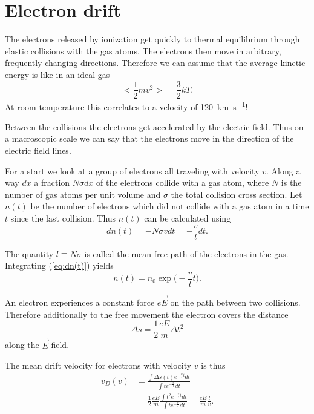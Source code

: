 \documentclass[12pt]{article}
\begin{document}
\section{Electron drift}

The electrons released by ionization get quickly to thermal equilibrium through elastic collisions with the gas atoms. The electrons then move in arbitrary, frequently changing directions. Therefore we can assume that the average kinetic energy is like in an ideal gas
\begin{equation}
< \frac{1}{2} m v^2 > = \frac{3}{2} k T.
\end{equation}
At room temperature this correlates to a velocity of \SI{120}{\kilo\meter\per\second}!

Between the collisions the electrons get accelerated by the electric field. Thus on a macroscopic scale we can say that the electrons move in the direction of the electric field lines.   

For a start we look at a group of electrons all traveling with velocity $v$. Along a way $dx$ a fraction $N \sigma dx$ of the electrons collide with a gas atom, where $N$ is the number of gas atoms per unit volume and $\sigma$ the total collision cross section. Let $n(t)$ be the number of electrons which did not collide with a gas atom in a time $t$ since the last collision. Thus $n(t)$ can be calculated using
\begin{equation}
dn(t) = - N \sigma v dt = -\frac{v}{l} dt.
\label{eq:dn(t)}
\end{equation}

The quantity $l \equiv N \sigma$ is called the mean free path of the electrons in the gas. Integrating (\ref{eq:dn(t)}) yields
\begin{equation}
n(t) = n_0 \exp\Big(-\frac{v}{l} t \Big).
\end{equation}

An electron experiences a constant force $e \vec{E}$ on the path between two collisions. Therefore additionally to the free movement the electron covers the distance 
\begin{equation}
\Delta s = \frac{1}{2} \frac{eE}{m} \Delta t^2
\end{equation}
along the $\vec{E}$-field.

The mean drift velocity for electrons with velocity $v$ is thus
\begin{align*}
 v_D(v) & = \frac{\int \Delta s(t) e^{-\frac{v}{l} t}dt}{\int t e^{-\frac{v}{l}}dt} \\
 & = \frac{1}{2}\frac{eE}{m} \frac{\int t^2 e^{-\frac{v}{l} t}dt}{\int t e^{-\frac{v}{l}}dt} = \frac{eE}{m} \frac{l}{v}.
\end{align*}
\end{document}
